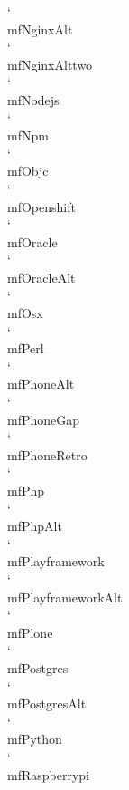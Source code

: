 \documentclass[parskip=half, twocolumn, 13pt]{scrartcl}
\begin{document}
\mfNginxAlt \quad \char`\\mfNginxAlt \\
\mfNginxAlttwo \quad \char`\\mfNginxAlttwo \\
\mfNodejs \quad \char`\\mfNodejs \\
\mfNpm \quad \char`\\mfNpm \\
\mfObjc \quad \char`\\mfObjc \\
\mfOpenshift \quad \char`\\mfOpenshift \\
\mfOracle \quad \char`\\mfOracle \\
\mfOracleAlt \quad \char`\\mfOracleAlt \\
\mfOsx \quad \char`\\mfOsx \\
\mfPerl \quad \char`\\mfPerl \\
\mfPhoneAlt \quad \char`\\mfPhoneAlt \\
\mfPhoneGap \quad \char`\\mfPhoneGap \\
\mfPhoneRetro \quad \char`\\mfPhoneRetro \\
\mfPhp \quad \char`\\mfPhp \\
\mfPhpAlt \quad \char`\\mfPhpAlt \\
\mfPlayframework \quad \char`\\mfPlayframework \\
\mfPlayframeworkAlt \quad \char`\\mfPlayframeworkAlt \\
\mfPlone \quad \char`\\mfPlone \\
\mfPostgres \quad \char`\\mfPostgres \\
\mfPostgresAlt \quad \char`\\mfPostgresAlt \\
\mfPython \quad \char`\\mfPython \\
\mfRaspberrypi \quad \char`\\mfRaspberrypi \\
\end{document}
